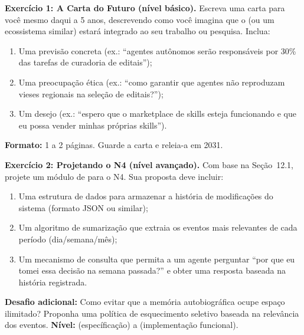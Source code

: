 \begin{exercicio}
\textbf{Exercício 1: A Carta do Futuro (nível básico).} Escreva uma
carta para você mesmo daqui a 5 anos, descrevendo como você imagina
que o \opencodeeco{} (ou um ecossistema similar) estará integrado
ao seu trabalho ou pesquisa. Inclua:
\begin{enumerate}
    \item Uma previsão concreta (ex.: ``agentes autônomos serão
    responsáveis por 30\% das tarefas de curadoria de editais'');
    \item Uma preocupação ética (ex.: ``como garantir que agentes
    não reproduzam vieses regionais na seleção de editais?'');
    \item Um desejo (ex.: ``espero que o marketplace de skills
    esteja funcionando e que eu possa vender minhas próprias
    skills'').
\end{enumerate}
\textbf{Formato:} 1 a 2 páginas. Guarde a carta e releia-a em 2031.
\end{exercicio}

\begin{exercicio}
\textbf{Exercício 2: Projetando o N4 (nível avançado).} Com base na
Seção~12.1, projete um módulo de 
para o N4. Sua proposta deve incluir:
\begin{enumerate}
    \item Uma estrutura de dados para armazenar a história de
    modificações do sistema (formato JSON ou similar);
    \item Um algoritmo de sumarização que extraia os eventos mais
    relevantes de cada período (dia/semana/mês);
    \item Um mecanismo de consulta que permita a um agente
    perguntar ``por que eu tomei essa decisão na semana passada?''
    e obter uma resposta baseada na história registrada.
\end{enumerate}
\textbf{Desafio adicional:} Como evitar que a memória autobiográfica
ocupe espaço ilimitado? Proponha uma política de esquecimento seletivo
baseada na relevância dos eventos.
\textbf{Nível:} \nivelavancado{} (específicação) a \nivelphd{}
(implementação funcional).
\end{exercicio}

